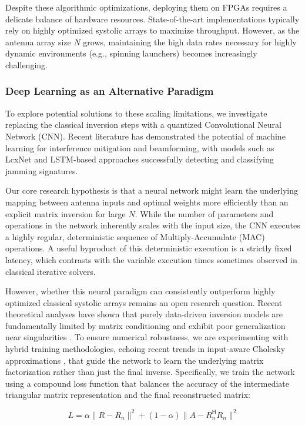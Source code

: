 \documentclass[11pt]{report}
\begin{document}
Despite these algorithmic optimizations, deploying them on FPGAs requires a delicate balance of hardware resources. State-of-the-art implementations typically rely on highly optimized systolic arrays to maximize throughput. However, as the antenna array size $N$ grows, maintaining the high data rates necessary for highly dynamic environments (e.g., spinning launchers) becomes increasingly challenging.

\subsubsection{Deep Learning as an Alternative Paradigm}
To explore potential solutions to these scaling limitations, we investigate replacing the classical inversion steps with a quantized Convolutional Neural Network (CNN). Recent literature has demonstrated the potential of machine learning for interference mitigation and beamforming, with models such as LcxNet and LSTM-based approaches successfully detecting and classifying jamming signatures.

Our core research hypothesis is that a neural network might learn the underlying mapping between antenna inputs and optimal weights more efficiently than an explicit matrix inversion for large $N$. While the number of parameters and operations in the network inherently scales with the input size, the CNN executes a highly regular, deterministic sequence of Multiply-Accumulate (MAC) operations. A useful byproduct of this deterministic execution is a strictly fixed latency, which contrasts with the variable execution times sometimes observed in classical iterative solvers.

However, whether this neural paradigm can consistently outperform highly optimized classical systolic arrays remains an open research question. Recent theoretical analyses have shown that purely data-driven inversion models are fundamentally limited by matrix conditioning and exhibit poor generalization near singularities \cite{rethinking_nn_inverse}. To ensure numerical robustness, we are experimenting with hybrid training methodologies, echoing recent trends in input-aware Cholesky approximations \cite{deng2025ia_chol}, that guide the network to learn the underlying matrix factorization rather than just the final inverse. Specifically, we train the network using a compound loss function that balances the accuracy of the intermediate triangular matrix representation and the final reconstructed matrix:

$$L = \alpha \| R - R_n \|^2 + (1 - \alpha) \| A - R_n^{\mathsf{H}} R_n \|^2$$
\end{document}
